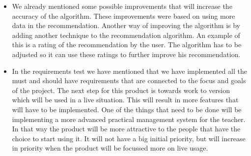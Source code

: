 \begin{itemize}
\item We already mentioned some possible improvements that will increase the accuracy of the algorithm.
These improvements were based on using more data in the recommendation.
Another way of improving the algorithm is by adding another technique to the recommendation algorithm.
An example of this is a rating of the recommendation by the user.
The algorithm has to be adjusted so it can use these ratings to further improve his recommendation.

\item In the requirements test we have mentioned that we have implemented all the must and should have requirements that are connected to the focus and goals of the project.
The next step for this product is towards work to version which will be used in a live situation.
This will result in more features that will have to be implemented.
One of the things that need to be done will be implementing a more advanced practical management system for the teacher.
In that way the product will be more attractive to the people that have the choice to start using it.
It will not have a big initial priority, but will increase in priority when the product will be focussed more on live usage.
\end{itemize}




